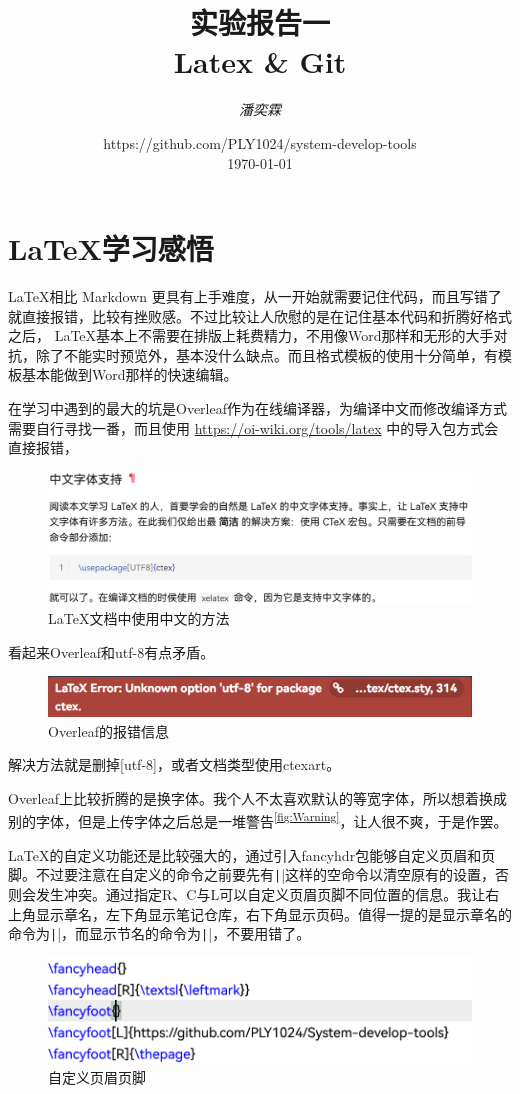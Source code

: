 \documentclass[fontset=ubuntu]{ctexart}
\title{\Huge \textbf{实验报告一\\ Latex{} \& Git}}
\author{\textit{潘奕霖}}
\date{https://github.com/PLY1024/system-develop-tools\\ \today}
\begin{document}
\maketitle
\newpage

\tableofcontents
\newpage

\section{ \LaTeX 学习感悟}
\LaTeX 相比 Markdown 更具有上手难度，从一开始就需要记住代码，而且写错了就直接报错，比较有挫败感。不过比较让人欣慰的是在记住基本代码和折腾好格式之后， \LaTeX 基本上不需要在排版上耗费精力，不用像Word那样和无形的大手对抗，除了不能实时预览外，基本没什么缺点。而且格式模板的使用十分简单，有模板基本能做到Word那样的快速编辑。

在学习中遇到的最大的坑是Overleaf作为在线编译器，为编译中文而修改编译方式需要自行寻找一番，而且使用 \url{https://oi-wiki.org/tools/latex} 中的导入包方式会直接报错，
\begin{figure}[hbt]
    \centering
    \includegraphics[width=0.5\linewidth]{Chinese.png}
    \caption{ \LaTeX 文档中使用中文的方法}
    \label{fig:Chinese}
\end{figure}
看起来Overleaf和utf-8有点矛盾。
\begin{figure}[hbt]
    \centering
    \includegraphics[width=0.5\linewidth]{Error.png}
    \caption{Overleaf的报错信息}
    \label{fig:Error}
\end{figure}

解决方法就是删掉[utf-8]，或者文档类型使用ctexart。

Overleaf上比较折腾的是换字体。我个人不太喜欢默认的等宽字体，所以想着换成别的字体，但是上传字体之后总是一堆警告\textsuperscript{\ref{fig:Warning}}，让人很不爽，于是作罢。

\LaTeX 的自定义功能还是比较强大的，通过引入fancyhdr包能够自定义页眉和页脚。不过要注意在自定义的命令之前要先有\texttt|\fancyhead{}|这样的空命令以清空原有的设置，否则会发生冲突。通过指定R、C与L可以自定义页眉页脚不同位置的信息。我让右上角显示章名，左下角显示笔记仓库，右下角显示页码。值得一提的是显示章名的命令为\texttt|\leftmark|，而显示节名的命令为\texttt|\rightmark|，不要用错了。
\begin{figure}[htb]
    \centering
    \includegraphics[width=0.5\linewidth]{Custom.png}
    \caption{自定义页眉页脚}
    \label{fig:Custom}
\end{figure}
\end{document}
